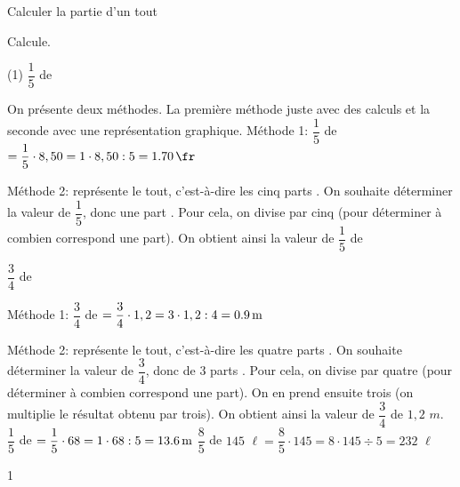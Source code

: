 \documentclass[a4paper,11pt]{report}
\begin{document}
\begin{resolu}{Calculer la partie d'un tout}{
Calcule. 


\begin{tasks}(1)
	\task $\dfrac{1}{5}$ de 


On présente deux méthodes. La première méthode juste avec des calculs et la seconde avec une représentation graphique. 
	Méthode 1: $\dfrac{1}{5}$ de 
	$=\dfrac{1}{5}\cdot 8,50=1\cdot 8,50 \div 5=\tunit{1,70}{\fr}$

	Méthode 2:  représente le tout, c'est-à-dire les cinq parts
.
On souhaite déterminer la valeur de $\dfrac{1}{5}$, donc une part
. Pour cela, on divise  par cinq (pour déterminer à combien correspond une part). On obtient ainsi la valeur de $\dfrac{1}{5}$ de 

\task $\dfrac{3}{4}$ de 

Méthode 1: $\dfrac{3}{4}$ de  $=\dfrac{3}{4}\cdot 1,2=3\cdot 1,2\div 4=\tunit{0,9}{\m}$

Méthode 2:  représente le tout, c'est-à-dire les quatre parts
.
On souhaite déterminer la valeur de $\dfrac{3}{4}$, donc de 3 parts
. Pour cela, on divise  par quatre (pour déterminer à combien correspond une part). On en prend ensuite trois (on multiplie le résultat obtenu par trois). On obtient ainsi la valeur de $\dfrac{3}{4}$ de $1,2$ $m$.
\task $\dfrac{1}{5}$ de $=\dfrac{1}{5}\cdot 68=1\cdot 68\div 5=\tunit{13,6}{\m}$
\task $\dfrac{8}{5}$ de $145$ $\ell=\dfrac{8}{5}\cdot 145=8\cdot 145\div 5=232$ $\ell$
\end{tasks}
}{1}
\end{resolu}
\end{document}
